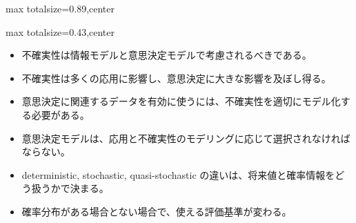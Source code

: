 \begin{minipage}[t]{0.58\textwidth}
\begin{adjustbox}{max totalsize={\textwidth}{0.89\textheight},center}
\begin{minipage}{\textwidth}
\end{minipage}
\end{adjustbox}
\end{minipage}


\clearpage
{}
\begin{minipage}[t]{0.405\textwidth}
\begin{adjustbox}{max totalsize={\textwidth}{0.43\textheight},center}
\begin{minipage}{\textwidth}\scriptsize
{}\begin{itemize}
\item 不確実性は情報モデルと意思決定モデルで考慮されるべきである。
\item 不確実性は多くの応用に影響し、意思決定に大きな影響を及ぼし得る。
\item 意思決定に関連するデータを有効に使うには、不確実性を適切にモデル化する必要がある。
\item 意思決定モデルは、応用と不確実性のモデリングに応じて選択されなければならない。
\end{itemize}\begin{itemize}
\item deterministic, stochastic, quasi-stochastic の違いは、将来値と確率情報をどう扱うかで決まる。
\item 確率分布がある場合とない場合で、使える評価基準が変わる。
\end{itemize}
\end{minipage}
\end{adjustbox}
\end{minipage}\hfill
